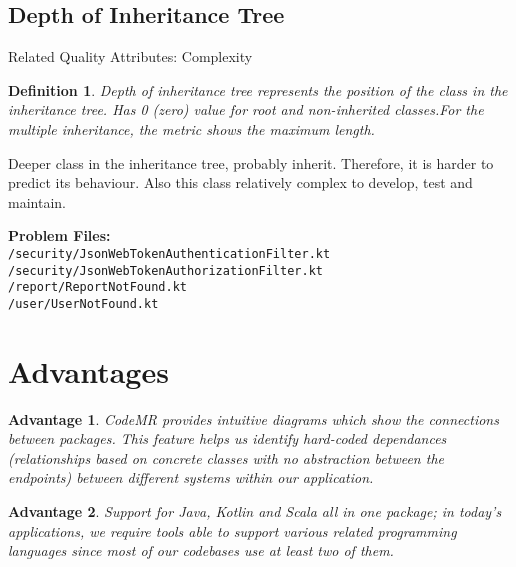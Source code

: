 \documentclass[11pt]{article}
\newtheorem{definition}{Definition}
\newtheorem{prof}{Advantage}
\begin{document}
\subsection{Depth of Inheritance Tree}

Related Quality Attributes: Complexity

\begin{definition}
Depth of inheritance tree represents the position of the class in the inheritance tree. Has 0 (zero) value for root and non-inherited classes.For the multiple inheritance, the metric shows the maximum length. 
\end{definition}

Deeper class in the inheritance tree, probably inherit. Therefore, it is harder to predict its behaviour. Also this class relatively complex to develop, test and maintain.

\begin{center}

\textbf{Problem Files:} \\
\texttt{/security/JsonWebTokenAuthenticationFilter.kt} \\
\texttt{/security/JsonWebTokenAuthorizationFilter.kt} \\
\texttt{/report/ReportNotFound.kt} \\
\texttt{/user/UserNotFound.kt} \\
\end{center}

\section{Advantages}

\begin{prof}
CodeMR provides intuitive diagrams which show the connections between packages. This feature helps us identify hard-coded dependances (relationships based on concrete classes with no abstraction between the endpoints) between different systems within our application.
\end{prof}

\begin{prof}
Support for Java, Kotlin and Scala all in one package; in today's applications, we require tools able to support various related programming languages since most of our codebases use at least two of them.
\end{prof}
\end{document}
